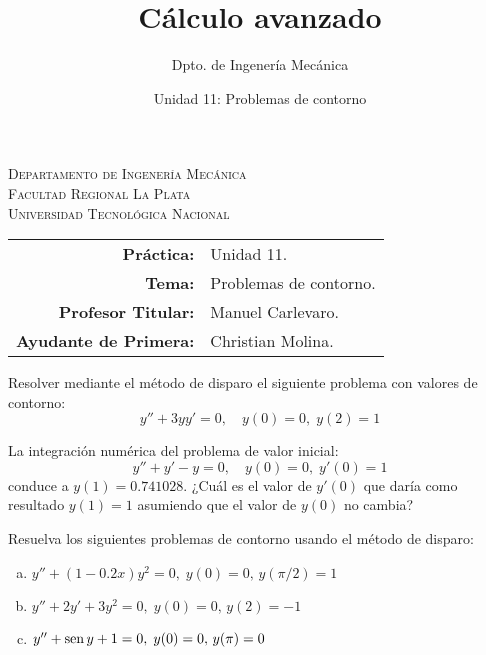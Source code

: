 \documentclass[11pt]{article}
\title{Cálculo avanzado}
\author{Dpto. de Ingenería Mecánica}
\date{Unidad 11: Problemas de contorno}
\begin{document}

\begin{center}
\end{center} 

\begin{center}
\vspace{\baselineskip}
\Large{\textsc{Departamento de Ingenería Mecánica}} \\
\textsc{Facultad Regional La Plata} \\
\textsc{Universidad Tecnológica Nacional}
\end{center}


\begin{center}
\begin{tabular}{r l}
    \textbf{Práctica:} & Unidad 11. \\
 \textbf{Tema:} & Problemas de contorno. \\
 \textbf{Profesor Titular:} & Manuel Carlevaro. \\
 \textbf{Ayudante de Primera:} & Christian Molina. \\
\end{tabular}\end{center}

\vspace{1em}

\begin{question} %
Resolver mediante el método de disparo el siguiente problema con valores de contorno:
\[ y'' + 3 y y' = 0, \quad y(0) = 0, \; y(2) = 1 \]
\end{question}

\begin{question} %
La integración numérica del problema de valor inicial:
\[ y'' + y' -y = 0, \quad y(0) = 0, \; y'(0) = 1 \]
conduce a $y(1) = 0.741028$. ¿Cuál es el valor de $y'(0)$ que daría como resultado $y(1) = 1$ asumiendo que el valor de $y(0)$ no cambia?
\end{question}

\begin{question} %
Resuelva los siguientes problemas de contorno usando el método de disparo:
\begin{enumerate}[a)]
    \item $y'' + (1 - 0.2 x) y^2 = 0, \; y(0) = 0, \, y(\pi/2) = 1$
    \item $y'' + 2 y' + 3 y^2 = 0, \; y(0) = 0, \, y(2) = -1$
    \item $y'' + \operatorname{sen} y + 1 = 0, \; y(0) = 0, \, y(\pi) = 0$
\end{enumerate}
\end{question}
\end{document}
